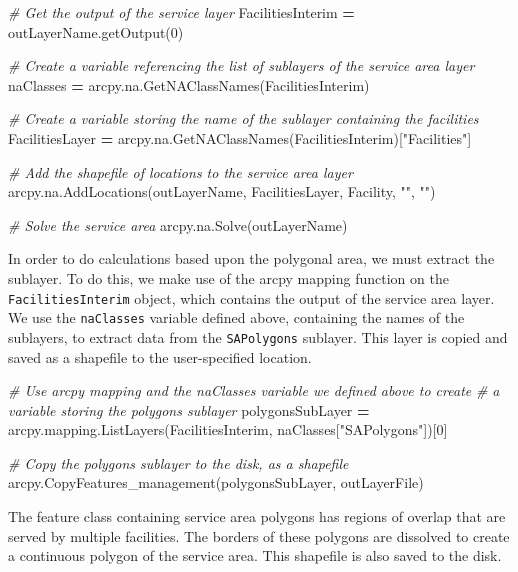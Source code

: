 \documentclass[11pt,]{article}
\newenvironment{Shaded}{\begin{snugshade}}{\end{snugshade}}
\newcommand{\DecValTok}[1]{\textcolor[rgb]{0.00,0.00,0.81}{{#1}}}
\newcommand{\StringTok}[1]{\textcolor[rgb]{0.31,0.60,0.02}{{#1}}}
\newcommand{\CommentTok}[1]{\textcolor[rgb]{0.56,0.35,0.01}{\textit{{#1}}}}
\newcommand{\OperatorTok}[1]{\textcolor[rgb]{0.81,0.36,0.00}{\textbf{{#1}}}}
\newcommand{\NormalTok}[1]{{#1}}
\begin{document}
\begin{Shaded}
\begin{Highlighting}[]
    \CommentTok{# Get the output of the service layer}
    \NormalTok{FacilitiesInterim }\OperatorTok{=} \NormalTok{outLayerName.getOutput(}\DecValTok{0}\NormalTok{)}

    \CommentTok{# Create a variable referencing the list of sublayers of the service area layer}
    \NormalTok{naClasses }\OperatorTok{=} \NormalTok{arcpy.na.GetNAClassNames(FacilitiesInterim)}

    \CommentTok{# Create a variable storing the name of the sublayer containing the facilities}
    \NormalTok{FacilitiesLayer }\OperatorTok{=} \NormalTok{arcpy.na.GetNAClassNames(FacilitiesInterim)[}\StringTok{"Facilities"}\NormalTok{]}

    \CommentTok{# Add the shapefile of locations to the service area layer}
    \NormalTok{arcpy.na.AddLocations(outLayerName, FacilitiesLayer, Facility, }\StringTok{""}\NormalTok{, }\StringTok{""}\NormalTok{)}

    \CommentTok{# Solve the service area}
    \NormalTok{arcpy.na.Solve(outLayerName)}
\end{Highlighting}
\end{Shaded}

\noindent In order to do calculations based upon the polygonal area, we
must extract the sublayer. To do this, we make use of the arcpy mapping
function on the \texttt{FacilitiesInterim} object, which contains the
output of the service area layer. We use the \texttt{naClasses} variable
defined above, containing the names of the sublayers, to extract data
from the \texttt{SAPolygons} sublayer. This layer is copied and saved as
a shapefile to the user-specified location.

\begin{Shaded}
\begin{Highlighting}[]

    \CommentTok{# Use arcpy mapping and the naClasses variable we defined above to create}
    \CommentTok{# a variable storing the polygons sublayer}
    \NormalTok{polygonsSubLayer }\OperatorTok{=} \NormalTok{arcpy.mapping.ListLayers(FacilitiesInterim,}
      \NormalTok{naClasses[}\StringTok{"SAPolygons"}\NormalTok{])[}\DecValTok{0}\NormalTok{]}

    \CommentTok{# Copy the polygons sublayer to the disk, as a shapefile}
    \NormalTok{arcpy.CopyFeatures_management(polygonsSubLayer, outLayerFile)}
\end{Highlighting}
\end{Shaded}

\noindent The feature class containing service area polygons has regions
of overlap that are served by multiple facilities. The borders of these
polygons are dissolved to create a continuous polygon of the service
area. This shapefile is also saved to the disk.
\end{document}
